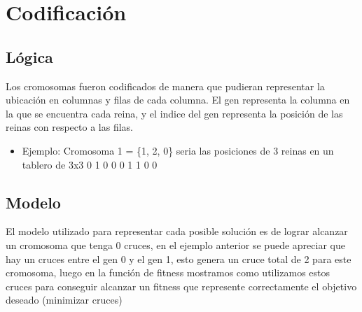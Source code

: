 \documentclass[11pt]{article}
\begin{document}
\section{Codificación}
\label{sec:org3017964}
\subsection{Lógica}
\label{sec:org7b5bbe9}
Los cromosomas fueron codificados de manera que pudieran representar la ubicación en columnas y filas de cada columna. El gen representa la columna en la que se encuentra cada reina, y el indice del gen representa la posición de las reinas con respecto a las filas.
\begin{itemize}
\item Ejemplo: Cromosoma 1 = \{1, 2, 0\} seria las posiciones de 3 reinas en un tablero de 3x3
0 1 0
0 0 1
1 0 0
\end{itemize}

\subsection{Modelo}
\label{sec:org9bc4bf7}
El modelo utilizado para representar cada posible solución es de lograr alcanzar un cromosoma que tenga 0 cruces, en el ejemplo anterior se puede apreciar que hay un cruces entre el gen 0 y el gen 1, esto genera un cruce total de 2 para este cromosoma, luego en la función de fitness mostramos como utilizamos estos cruces para conseguir alcanzar un fitness que represente correctamente el objetivo deseado (minimizar cruces)
\end{document}
